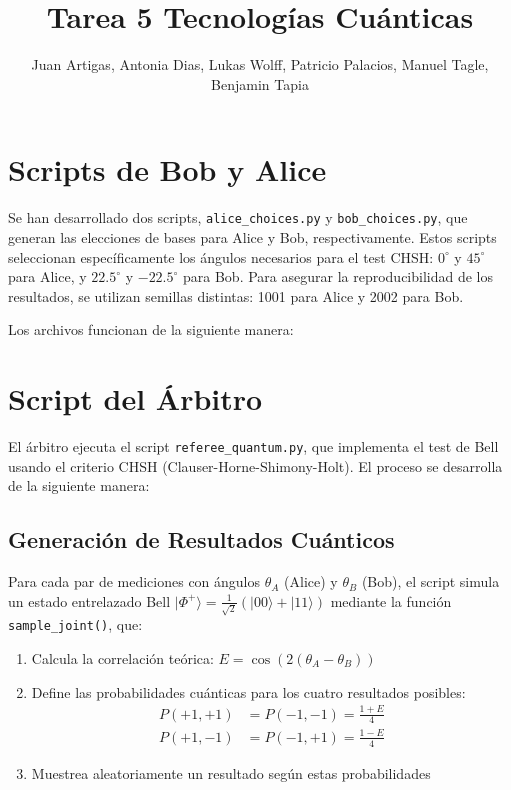 \documentclass[11pt]{article}
\title{Tarea 5 Tecnologías Cuánticas}
\author{Juan Artigas,
    Antonia Dias,
    Lukas Wolff,
    Patricio Palacios,
    Manuel Tagle,
    Benjamin Tapia}
\date{}
\begin{document}
\maketitle

\section{Scripts de Bob y Alice}

Se han desarrollado dos scripts, \texttt{alice\_choices.py} y \texttt{bob\_choices.py}, que generan las elecciones de bases para Alice y Bob, respectivamente. Estos scripts seleccionan específicamente los ángulos necesarios para el test CHSH: $0^\circ$ y $45^\circ$ para Alice, y $22.5^\circ$ y $-22.5^\circ$ para Bob. Para asegurar la reproducibilidad de los resultados, se utilizan semillas distintas: 1001 para Alice y 2002 para Bob.

Los archivos funcionan de la siguiente manera:

\section{Script del Árbitro}

El árbitro ejecuta el script \texttt{referee\_quantum.py}, que implementa el test de Bell usando el criterio CHSH (Clauser-Horne-Shimony-Holt). El proceso se desarrolla de la siguiente manera:

\subsection{Generación de Resultados Cuánticos}

Para cada par de mediciones con ángulos $\theta_A$ (Alice) y $\theta_B$ (Bob), el script simula un estado entrelazado Bell $|\Phi^+\rangle = \frac{1}{\sqrt{2}}(|00\rangle + |11\rangle)$ mediante la función \texttt{sample\_joint()}, que:

\begin{enumerate}
    \item Calcula la correlación teórica: $E = \cos(2(\theta_A - \theta_B))$
    \item Define las probabilidades cuánticas para los cuatro resultados posibles:
    \begin{align}
        P(+1,+1) &= P(-1,-1) = \frac{1+E}{4} \\
        P(+1,-1) &= P(-1,+1) = \frac{1-E}{4}
    \end{align}
    \item Muestrea aleatoriamente un resultado según estas probabilidades
\end{enumerate}
\end{document}
